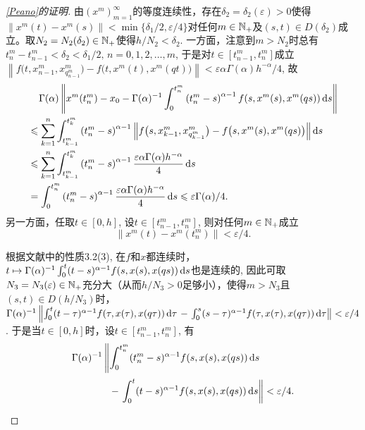 \begin{proof}[\cref{Peano}的证明]
    由$\left(x^m\right)_{m=1}^\infty$的等度连续性，存在$\delta_2=\delta_2(\varepsilon)>0$使得$\left\|x^m(t)-x^m(s)\right\|<\min \{\delta_1/2,\varepsilon/4\}$对任何$m\in \mathbb{N_+}$及$(s,t)\in D\left(\delta_2\right)$成立。取$N_2=N_2(\delta_2)\in \mathbb{N_+}$使得$h/N_2<\delta_2$. 一方面，注意到$m>N_2$时总有$t^m_n-t^m_{n-1}<\delta_2<\delta_1/2,\,n=0,1,2,\dots,m$, 于是对$t\in\left[t^m_{n-1},t^m_n\right]$成立$\left\|f\bigl(t,x^m_{n-1},x^m_{q^m_{n-1}}\bigr)-f\bigl(t,x^m(t),x^m(qt)\bigr)\right\|<\varepsilon \alpha \Gamma(\alpha) h^{-\alpha}/4$, 故
    \begin{equation}\label{tn}
        \begin{aligned}
            &\relphantom{\leqslant}\Gamma(\alpha)\left\|x^m(t^m_n)-x_0-\Gamma(\alpha)^{-1}\int_{0}^{t^m_n}\left(t^m_n-s\right)^{\alpha-1}f(s,x^m(s),x^m(qs))\differential s\right\|
            \\ &\leqslant \sum_{k=1}^{n}\int_{t^m_{k-1}}^{t^m_k}\left(t^m_n-s\right)^{\alpha-1}\left\|f\bigl(s,x^m_{k-1},x^m_{q^m_{k-1}}\bigr)-f\bigl(s,x^m(s),x^m(qs)\bigr)\right\|\differential s
            \\ &\leqslant \sum_{k=1}^{n}\int_{t^m_{k-1}}^{t^m_k}\left(t^m_n-s\right)^{\alpha-1} \frac{\varepsilon \alpha \Gamma(\alpha) h^{-\alpha}}{4} \differential s
            \\ &=\int_{0}^{t^m_n} \left(t^m_n-s\right)^{\alpha-1} \frac{\varepsilon \alpha \Gamma(\alpha) h^{-\alpha}}{4} \differential s
            \leqslant \varepsilon\Gamma(\alpha)/4.
        \end{aligned}
    \end{equation}
    另一方面，任取$t\in [0,h]$, 设$t\in\left[t^m_{n-1},t^m_n\right]$, 则对任何$m\in \mathbb{N_+}$成立
    \begin{equation}\label{xmtnt}
        \left\|x^m(t)-x^m(t^m_n)\right\|<\varepsilon/4.
    \end{equation}

    根据文献中的性质3.2(3), 在$f$和$x$都连续时，$t\mapsto \Gamma(\alpha)^{-1}\int_{0}^{t}(t-s)^{\alpha-1}f(s,x(s),x(qs))\mathop{}\!\mathrm{d} s$也是连续的, 因此可取$N_3=N_3(\varepsilon)\in \mathbb{N_+}$充分大（从而$h/N_3>0$足够小），使得$m>N_3$且$(s,t)\in D(h/N_3)$时，$\Gamma(\alpha)^{-1}\allowbreak\left\|\int_{0}^{t}(t-\tau)^{\alpha-1}f(\tau,x(\tau),x(q\tau))\mathop{}\!\mathrm{d} \tau\right.\allowbreak-\left.\int_{0}^{s}(s-\tau)^{\alpha-1}f(\tau,x(\tau),x(q\tau))\mathop{}\!\mathrm{d} \tau\right\|\allowbreak <\varepsilon/4$. 于是当$t\in [0,h]$时，设$t\in\left[t^m_{n-1},t^m_n\right]$, 有
    \begin{equation}\label{xtnt}
        \begin{aligned}
            \Gamma(\alpha)^{-1}&\left\|\int_{0}^{t^m_n}(t^m_n-s)^{\alpha-1}f(s,x(s),x(qs))\differential s\right.
            \\&\phantom{\left\|\vphantom{\int_{0}^{t^m_n}}\right.}-\left.\int_{0}^{t}(t-s)^{\alpha-1}f(s,x(s),x(qs))\differential s\right\|<\varepsilon/4.
        \end{aligned}
    \end{equation}
    

\end{proof}
